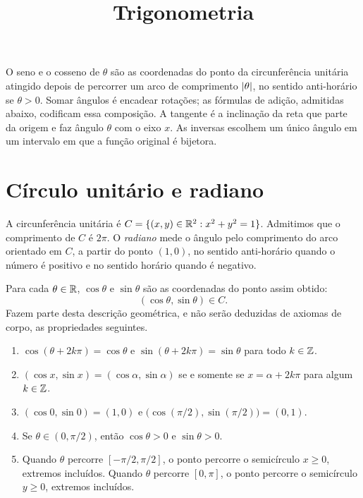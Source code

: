 \documentclass[11pt,a4paper]{article}
\title{Trigonometria}
\author{}
\date{}
\begin{document}
\maketitle
\tableofcontents


\begin{intuicao}
O seno e o cosseno de $\theta$ são as coordenadas do ponto da circunferência unitária atingido depois de percorrer um arco de comprimento $\left\lvert \theta \right\rvert$, no sentido anti-horário se $\theta>0$. Somar ângulos é encadear rotações; as fórmulas de adição, admitidas abaixo, codificam essa composição. A tangente é a inclinação da reta que parte da origem e faz ângulo $\theta$ com o eixo $x$. As inversas escolhem um único ângulo em um intervalo em que a função original é bijetora.
\end{intuicao}

\section{Círculo unitário e radiano}

\begin{definicao}\label{def:circulo}
A circunferência unitária é $C=\{(x,y)\in\mathbb{R}^2:x^2+y^2=1\}$. Admitimos que o comprimento de $C$ é $2\pi$. O \emph{radiano} mede o ângulo pelo comprimento do arco orientado em $C$, a partir do ponto $(1,0)$, no sentido anti-horário quando o número é positivo e no sentido horário quando é negativo.

Para cada $\theta\in\mathbb{R}$, $\cos\theta$ e $\sin\theta$ são as coordenadas do ponto assim obtido:
\[
(\cos\theta,\sin\theta)\in C.
\]
Fazem parte desta descrição geométrica, e não serão deduzidas de axiomas de corpo, as propriedades seguintes.
\begin{enumerate}
\item $\cos(\theta+2k\pi)=\cos\theta$ e $\sin(\theta+2k\pi)=\sin\theta$ para todo $k\in\mathbb{Z}$.
\item $(\cos x,\sin x)=(\cos\alpha,\sin\alpha)$ se e somente se $x=\alpha+2k\pi$ para algum $k\in\mathbb{Z}$.
\item $(\cos 0,\sin 0)=(1,0)$ e $\bigl(\cos(\pi/2),\sin(\pi/2)\bigr)=(0,1)$.
\item Se $\theta\in(0,\pi/2)$, então $\cos\theta>0$ e $\sin\theta>0$.
\item Quando $\theta$ percorre $[-\pi/2,\pi/2]$, o ponto percorre o semicírculo $x\ge 0$, extremos incluídos. Quando $\theta$ percorre $[0,\pi]$, o ponto percorre o semicírculo $y\ge 0$, extremos incluídos.
\end{enumerate}
\end{definicao}
\end{document}
